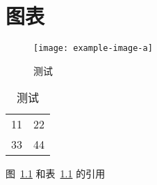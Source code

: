 
\chapter{图表}


\begin{figure}[htbp]
  \centering
  \texttt{[image: example-image-a]}
  \caption{测试}
  \label{figure:test1}
\end{figure}

\begin{table}[htbp]
  \centering
  \caption{测试}
  \label{table:test1}
  \begin{tabular}{|c|c|}
    11 & 22 \\
    33 & 44 
  \end{tabular}
\end{table}


图~\ref{figure:test1} 和表~\ref{table:test1} 的引用